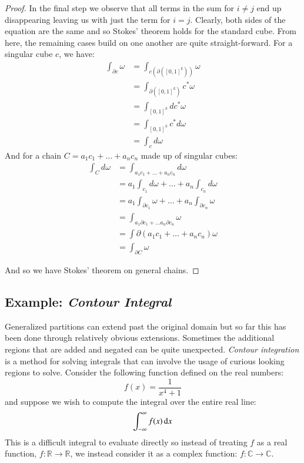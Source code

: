 \begin{proof}
In the final step we observe that all terms in the sum for $i \neq j$ end up disappearing leaving us with just the term for
$i=j$.
Clearly, both sides of the equation are the same and so Stokes' theorem holds for the standard cube.
From here, the remaining cases build on one another are quite straight-forward.
For a singular cube $c$, we have:
\begin{align*}
	\int_{\partial c} \omega
		&= \int_{c (\partial ([0,1]^k))} \omega \\
		&= \int_{\partial( [0,1]^k)} c^* \omega \\
		&= \int_{[0,1]^k} dc^* \omega \\
		&= \int_{[0,1]^k} c^* d \omega \\
		&= \int_c d\omega
\end{align*}
And for a chain $C=a_1 c_1 + \ldots + a_n c_n$ made up of singular cubes:
\begin{align*}
	\int_C d\omega 
		&= \int_{a_1c_1 + \ldots + a_nc_n	} d\omega \\
		&= a_1 \int_{c_1} d\omega + \ldots + a_n \int_{c_n} d\omega \\
		&= a_1 \int_{\partial c_1} \omega + \ldots + a_n \int_{\partial c_n} \omega \\
		&= \int_{a_1 \partial c_1 + \ldots a_n \partial c_n} \omega \\
		&= \int{\partial ( a_1c_1 + \ldots + a_n c_n)} \omega \\
		&= \int_{\partial C} \omega
\end{align*}

And so we have Stokes' theorem on general chains.
\end{proof}

\subsection{Example: \emph{Contour Integral}}


Generalized partitions can extend past the original domain but so far this has been done through relatively
obvious extensions.
Sometimes the additional regions that are added and negated can be quite unexpected.
\emph{Contour integration} is a method for solving integrals that can involve the usage of curious looking regions to solve.
Consider the following function defined on the real numbers:
\begin{equation}
	f(x) = \frac{1}{x^4 + 1}
\end{equation}
and suppose we wish to compute the integral over the entire real line:
\begin{equation}
	 \int_{-\infty}^\infty f(x) \mathop{}\!\mathrm{d} x
\end{equation}
This is a difficult integral to evaluate directly so instead of treating $f$ as a real function, $f:\mathbb{R} \to \mathbb{R}$, 
we instead consider it as a complex function: $f:\mathbb{C} \to \mathbb{C}$.


